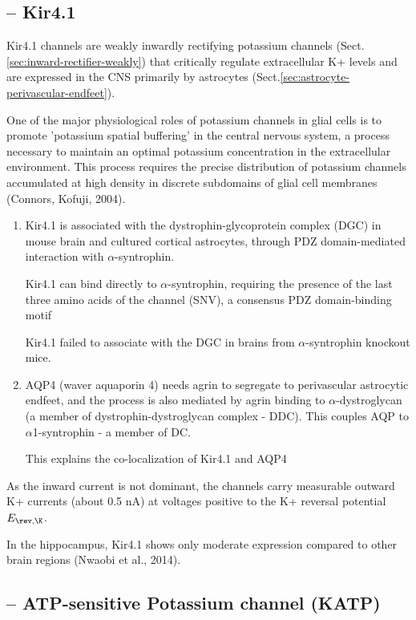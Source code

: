 \subsection{-- Kir4.1}
\label{sec:Kir4.1}

Kir4.1 channels are weakly inwardly rectifying potassium channels
(Sect.\ref{sec:inward-rectifier-weakly}) that critically regulate extracellular
K+ levels and are expressed in the CNS primarily by astrocytes
(Sect.\ref{sec:astrocyte-perivascular-endfeet}).

One of the major physiological roles of potassium channels in glial cells is to
promote 'potassium spatial buffering' in the central nervous system, a process
necessary to maintain an optimal potassium concentration in the extracellular
environment. This process requires the precise distribution of potassium
channels accumulated at high density in discrete subdomains of glial cell
membranes (Connors, Kofuji, 2004).
\begin{enumerate}
  \item  Kir4.1 is associated with the dystrophin-glycoprotein complex (DGC) in
  mouse brain and cultured cortical astrocytes, through PDZ domain-mediated
  interaction with $\alpha$-syntrophin.
 
Kir4.1 can bind directly to $\alpha$-syntrophin, requiring the presence of the
last three amino acids of the channel (SNV), a consensus PDZ domain-binding motif

 Kir4.1 failed to associate with the DGC in brains from $\alpha$-syntrophin
 knockout mice.
 
  \item AQP4 (waver aquaporin 4) needs agrin to segregate to perivascular
  astrocytic endfeet, and the process is also mediated by
  agrin binding to $\alpha$-dystroglycan (a member of dystrophin-dystroglycan
  complex - DDC). This couples AQP to $\alpha$1-syntrophin - a member of DC.
  
This  explains the co-localization of Kir4.1 and AQP4
\end{enumerate}


As the inward current is not dominant, the channels carry measurable outward
K+ currents (about 0.5 nA) at voltages positive to the K+ reversal potential
$E_{\rev,\K}$. %

In the hippocampus, Kir4.1 shows only moderate expression compared to other
brain regions (Nwaobi et al., 2014). 

\subsection{-- ATP-sensitive Potassium channel (KATP)}
\label{sec:Kir_KATP}


